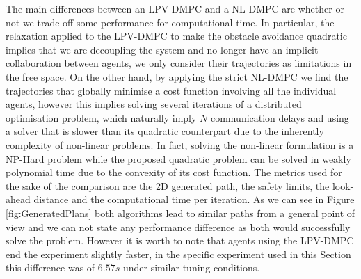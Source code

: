 \documentclass[a4paper,fleqn]{cas-sc}
\begin{document}
The main differences between an LPV-DMPC and a NL-DMPC are whether or not we trade-off some performance for computational time. In particular, the relaxation applied to the LPV-DMPC to make the obstacle avoidance quadratic implies that we are decoupling the system and no longer have an implicit collaboration between agents, we only consider their trajectories as limitations in the free space. On the other hand, by applying the strict NL-DMPC we find the trajectories that globally minimise a cost function involving all the individual agents, however this implies solving several iterations of a distributed optimisation problem, which naturally imply $N$ communication delays and using a solver that is slower than its quadratic counterpart due to the inherently complexity of non-linear problems. In fact, solving the non-linear formulation is a NP-Hard problem \cite{nl_time} while the proposed quadratic problem can be solved in weakly polynomial time \cite{poly_time} due to the convexity of its cost function. The metrics used for the sake of the comparison are the 2D generated path, the safety limits, the look-ahead distance and the computational time per iteration. As we can see in Figure \ref{fig:GeneratedPlans} both algorithms lead to similar paths from a general point of view and we can not state any performance difference as both would successfully solve the problem. However it is worth to note that agents using the LPV-DMPC end the experiment slightly faster, in the specific experiment used in this Section this difference was of $6.57s$ under similar tuning conditions.\\ 
\end{document}

